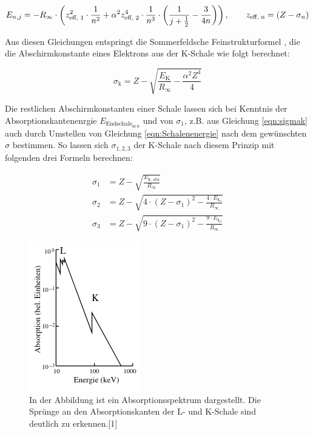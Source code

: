 \documentclass[titlepage = firstcover]{scrartcl}
\begin{document}
            \begin{equation}
              E_{n,j} = -R_{\infty} \cdot \left(z_{\text{eff, 1}}^2 \cdot \frac{1}{n^2} + \alpha ^2 z_{\text{eff, 2}}^4 \cdot \frac{1}{n^3} \cdot \left(\frac{1}{j+\frac{1}{2}} - \frac{3}{4n}\right)\right), \qquad z_{\text{eff, n}} = (Z-\sigma_n)
              \noindent \label{eqn:Enj}
            \end{equation}
            
            \noindent
            Aus diesen Gleichungen entspringt die Sommerfeldsche Feinstrukturformel , die die Abschirmkonstante eines Elektrons aus der K-Schale wie folgt berechnet:

            \begin{equation}
              \sigma_{\text{k}} = Z - \sqrt{\frac{E_{\text{K}}}{R_{\infty}} - \frac{\alpha ^2 Z^4}{4}}
              \label{eqn:sigmak}
            \end{equation}
            
            \noindent
            Die  restlichen Abschirmkonstanten einer Schale lassen sich bei Kenntnis der Absorptionskantenenrgie $E_{\text{Endschale}_{\text{m-n}}}$ und von $\sigma_1$, z.B. aus Gleichung 
            \ref{eqn:sigmak} auch durch Umstellen von Gleichung \ref{eqn:Schalenenergie} nach dem gewünschten $\sigma$ bestimmen. So lassen sich $\sigma_{1,2,3}$ der K-Schale nach diesem
            Prinzip mit folgenden drei Formeln berechnen:
            
            \begin{align}
              \sigma_1 &= Z - \sqrt{\frac{E_{\text{k, abs}}}{R_{\infty}}} \\
              \sigma_2 &= Z - \sqrt{4 \cdot \left(Z - \sigma_1\right)^2 - \frac{4 \cdot E_{\text{k}_{\alpha}}}{R_{\infty}}} \\
              \sigma_3 &= Z - \sqrt{9 \cdot \left(Z - \sigma_1\right)^2 - \frac{9 \cdot E_{\text{k}_{\beta}}}{R_{\infty}}} 
              \label{eqn:Cusigmas}
            \end{align}
            \noindent

            \FloatBarrier

            \begin{figure}[h]
              \centering
              \includegraphics{Kanten.png}
              \caption{In der Abbildung ist ein Absorptionsspektrum dargestellt. Die Sprünge an den Absorptionskanten der L- und K-Schale sind deutlich zu erkennen.[1]}
              \label{fig:SkizzeBragg}
            \end{figure}
\end{document}

